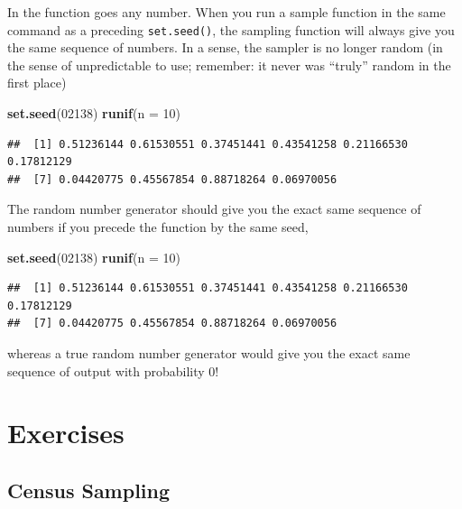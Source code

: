 \documentclass[]{book}
\newenvironment{Shaded}{\begin{snugshade}}{\end{snugshade}}
\newcommand{\DataTypeTok}[1]{\textcolor[rgb]{0.13,0.29,0.53}{#1}}
\newcommand{\DecValTok}[1]{\textcolor[rgb]{0.00,0.00,0.81}{#1}}
\newcommand{\KeywordTok}[1]{\textcolor[rgb]{0.13,0.29,0.53}{\textbf{#1}}}
\newcommand{\NormalTok}[1]{#1}
\theoremstyle{definition}
\theoremstyle{definition}
\theoremstyle{definition}
\theoremstyle{remark}
\begin{document}
In the function goes any number. When you run a sample function in the same command as a preceding \texttt{set.seed()}, the sampling function will always give you the same sequence of numbers. In a sense, the sampler is no longer random (in the sense of unpredictable to use; remember: it never was ``truly'' random in the first place)

\begin{Shaded}
\begin{Highlighting}[]
\KeywordTok{set.seed}\NormalTok{(}\DecValTok{02138}\NormalTok{)}
\KeywordTok{runif}\NormalTok{(}\DataTypeTok{n =} \DecValTok{10}\NormalTok{)}
\end{Highlighting}
\end{Shaded}

\begin{verbatim}
##  [1] 0.51236144 0.61530551 0.37451441 0.43541258 0.21166530 0.17812129
##  [7] 0.04420775 0.45567854 0.88718264 0.06970056
\end{verbatim}

The random number generator should give you the exact same sequence of numbers if you precede the function by the same seed,

\begin{Shaded}
\begin{Highlighting}[]
\KeywordTok{set.seed}\NormalTok{(}\DecValTok{02138}\NormalTok{)}
\KeywordTok{runif}\NormalTok{(}\DataTypeTok{n =} \DecValTok{10}\NormalTok{)}
\end{Highlighting}
\end{Shaded}

\begin{verbatim}
##  [1] 0.51236144 0.61530551 0.37451441 0.43541258 0.21166530 0.17812129
##  [7] 0.04420775 0.45567854 0.88718264 0.06970056
\end{verbatim}

whereas a true random number generator would give you the exact same sequence of output with probability 0!

\hypertarget{exercises-4}{%
\section*{Exercises}\label{exercises-4}}

\hypertarget{census-sampling}{%
\subsection*{Census Sampling}\label{census-sampling}}
\end{document}
